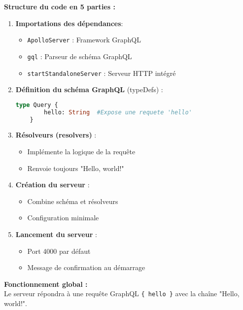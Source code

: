 \documentclass{article}
\begin{document}
\begin{tcolorbox}[
    title=Explication du code Apollo Server,
    colback=blue!5!white,
    colframe=blue!75!black,
    fonttitle=\bfseries]
    
\textbf{Structure du code en 5 parties :}

\begin{enumerate}
    \item \textbf{Importations des dépendances}:
    \begin{itemize}
        \item \texttt{ApolloServer} : Framework GraphQL
        \item \texttt{gql} : Parseur de schéma GraphQL
        \item \texttt{startStandaloneServer} : Serveur HTTP intégré
    \end{itemize}
    
    \item \textbf{Définition du schéma GraphQL} (typeDefs) :
    \begin{lstlisting}[language=GraphQL,basicstyle=\ttfamily\small]
    type Query {
        hello: String  #Expose une requete 'hello'
    }
    \end{lstlisting}
    
    \item \textbf{Résolveurs (resolvers)} :
    \begin{itemize}
        \item Implémente la logique de la requête
        \item Renvoie toujours "Hello, world!"
    \end{itemize}
    
    \item \textbf{Création du serveur} :
    \begin{itemize}
        \item Combine schéma et résolveurs
        \item Configuration minimale
    \end{itemize}
    
    \item \textbf{Lancement du serveur} :
    \begin{itemize}
        \item Port 4000 par défaut
        \item Message de confirmation au démarrage
    \end{itemize}
\end{enumerate}

\textbf{Fonctionnement global :} \\
Le serveur répondra à une requête GraphQL \texttt{\{ hello \}} avec la chaîne "Hello, world!".
\end{tcolorbox}
\end{document}
